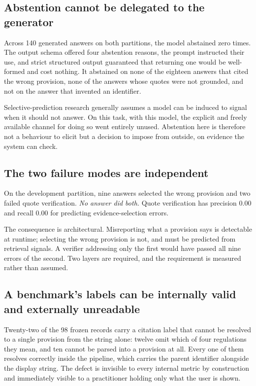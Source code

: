\subsection{Abstention cannot be delegated to the generator}

Across 140 generated answers on both partitions, the model abstained zero times.
The output schema offered four abstention reasons, the prompt instructed their
use, and strict structured output guaranteed that returning one would be
well-formed and cost nothing. It abstained on none of the eighteen answers that
cited the wrong provision, none of the answers whose quotes were not grounded,
and not on the answer that invented an identifier.

Selective-prediction research generally assumes a model can be induced to signal
when it should not answer. On this task, with this model, the explicit and freely
available channel for doing so went entirely unused. Abstention here is therefore
not a behaviour to elicit but a decision to impose from outside, on evidence the
system can check.

\subsection{The two failure modes are independent}

On the development partition, nine answers selected the wrong provision and two
failed quote verification. \emph{No answer did both.} Quote verification has
precision 0.00 and recall 0.00 for predicting evidence-selection errors.

The consequence is architectural. Misreporting what a provision says is
detectable at runtime; selecting the wrong provision is not, and must be
predicted from retrieval signals. A verifier addressing only the first would have
passed all nine errors of the second. Two layers are required, and the
requirement is measured rather than assumed.

\subsection{A benchmark's labels can be internally valid and externally
unreadable}

Twenty-two of the 98 frozen records carry a citation label that cannot be
resolved to a single provision from the string alone: twelve omit which of four
regulations they mean, and ten cannot be parsed into a provision at all. Every
one of them resolves correctly inside the pipeline, which carries the parent
identifier alongside the display string. The defect is invisible to every
internal metric by construction and immediately visible to a practitioner holding
only what the user is shown.

